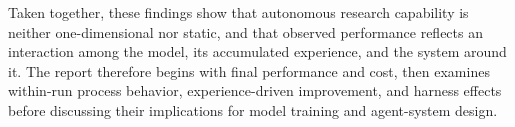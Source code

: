 Taken together, these findings show that autonomous research capability is neither one-dimensional nor static, and that observed performance reflects an interaction among the model, its accumulated experience, and the system around it.
The report therefore begins with final performance and cost, then examines within-run process behavior, experience-driven improvement, and harness effects before discussing their implications for model training and agent-system design.









